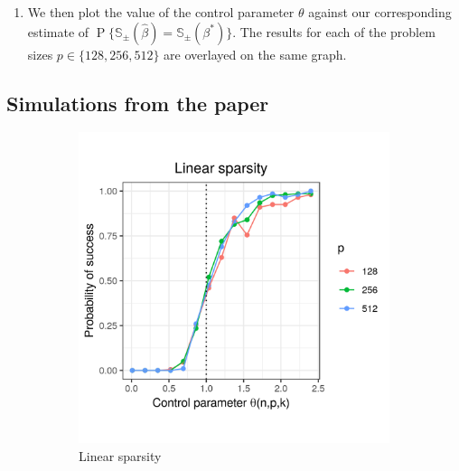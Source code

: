\documentclass[letterpaper,12pt]{article}
\DeclareMathOperator{\prob}{P}
\begin{document}
\begin{enumerate}
\item We then plot the value of the control parameter $\theta$ against
  our corresponding estimate of
  $\prob\{\mathbb{S}_\pm(\hat{\beta}) =
  \mathbb{S}_\pm(\beta^\ast)\}$. The results for each of the problem
  sizes $p \in \{128, 256, 512\}$ are overlayed on the same graph.
\end{enumerate}

\subsection*{Simulations from the paper}

\begin{figure}[h]
  \centering
  \begin{subfigure}{0.48\textwidth}
    \includegraphics[width=0.9\linewidth]{uniform_linear_sparsity_alpha_1}
    \caption{Linear sparsity}
    \label{fig:uniform_linear_sparsity_alpha_1}
  \end{subfigure}
  \begin{subfigure}{0.48\textwidth}

\end{subfigure}
\end{figure}
\end{document}
